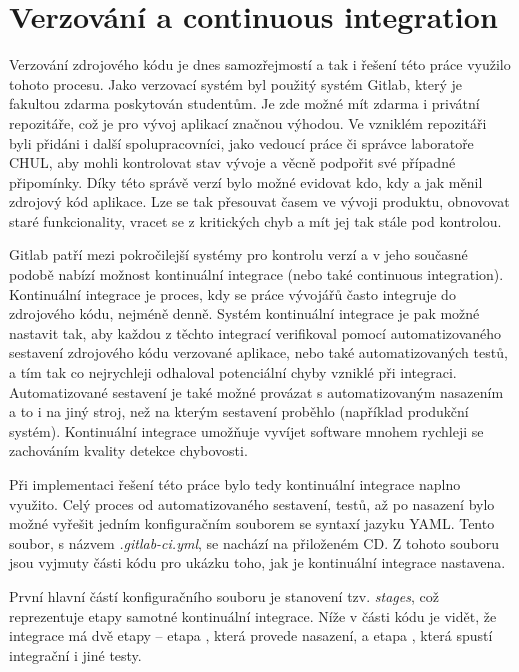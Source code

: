 \documentclass[thesis=M,czech]{FITthesis}[2012/06/26]
\begin{document}
\section{Verzování a continuous integration} \label{sec:impl_gitlab}
Verzování zdrojového kódu je dnes samozřejmostí a tak i řešení této práce využilo tohoto procesu. Jako verzovací systém byl použitý systém Gitlab, který je fakultou zdarma poskytován studentům. Je zde možné mít zdarma i privátní repozitáře, což je pro vývoj aplikací značnou výhodou. Ve vzniklém repozitáři byli přidáni i další spolupracovníci, jako vedoucí práce či správce laboratoře CHUL, aby mohli kontrolovat stav vývoje a věcně podpořit své případné připomínky. Díky této správě verzí bylo možné evidovat kdo, kdy a jak měnil zdrojový kód aplikace. Lze se tak přesouvat časem ve vývoji produktu, obnovovat staré funkcionality, vracet se z kritických chyb a mít jej tak stále pod kontrolou.

Gitlab patří mezi pokročilejší systémy pro kontrolu verzí a v jeho současné podobě nabízí možnost kontinuální integrace (nebo také continuous integration). Kontinuální integrace je proces, kdy se práce vývojářů často integruje do zdrojového kódu, nejméně denně. Systém kontinuální integrace je pak možné nastavit tak, aby každou z těchto integrací verifikoval pomocí automatizovaného sestavení zdrojového kódu verzované aplikace, nebo také automatizovaných testů, a tím tak co nejrychleji odhaloval potenciální chyby vzniklé při integraci. Automatizované sestavení je také možné provázat s automatizovaným nasazením a to i na jiný stroj, než na kterým sestavení proběhlo (například produkční systém). Kontinuální integrace umožňuje vyvíjet software mnohem rychleji se zachováním kvality detekce chybovosti. 

Při implementaci řešení této práce bylo tedy kontinuální integrace naplno využito. Celý proces od automatizovaného sestavení, testů, až po nasazení bylo možné vyřešit jedním konfiguračním souborem se syntaxí jazyku YAML. Tento soubor, s názvem \textit{.gitlab-ci.yml}, se nachází na přiloženém CD. Z tohoto souboru jsou vyjmuty části kódu pro ukázku toho, jak je kontinuální integrace nastavena.

První hlavní částí konfiguračního souboru je stanovení tzv. \textit{stages}, což reprezentuje etapy samotné kontinuální integrace. Níže v části kódu je vidět, že integrace má dvě etapy -- etapa , která provede nasazení, a etapa , která spustí integrační i jiné testy.\\
\end{document}
